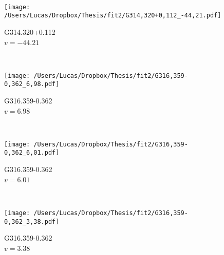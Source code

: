 \begin{figure*}[t]
\begin{subfigure}[t]{0.3\textwidth}
	\end{subfigure}
	~
	\begin{subfigure}[t]{0.3\textwidth}
		\texttt{[image: /Users/Lucas/Dropbox/Thesis/fit2/G314,320+0,112\_-44,21.pdf]}
		\caption[]{G314.320+0.112\\$v=-44.21$\,\kms}
	\end{subfigure}
	~
	\begin{subfigure}[t]{0.3\textwidth}
		\texttt{[image: /Users/Lucas/Dropbox/Thesis/fit2/G316,359-0,362\_6,98.pdf]}
		\caption[]{G316.359-0.362\\$v=6.98$\,\kms}
	\end{subfigure}
	~
	\begin{subfigure}[t]{0.3\textwidth}
		\texttt{[image: /Users/Lucas/Dropbox/Thesis/fit2/G316,359-0,362\_6,01.pdf]}
		\caption[]{G316.359-0.362\\$v=6.01$\,\kms}
	\end{subfigure}
	~
	\begin{subfigure}[t]{0.3\textwidth}
		\texttt{[image: /Users/Lucas/Dropbox/Thesis/fit2/G316,359-0,362\_3,38.pdf]}
		\caption[]{G316.359-0.362\\$v=3.38$\,\kms}
	\end{subfigure}
	~
\end{figure*}
\clearpage
